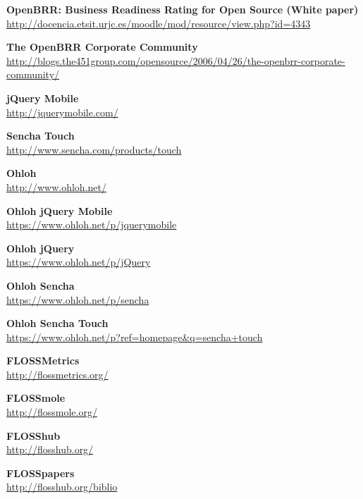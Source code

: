 \documentclass[a4paper,12pt]{book}
\begin{document}
\begin{thebibliography}{25}
 

\textbf{OpenBRR: Business Readiness Rating for
Open Source (White paper)}\\
{\footnotesize\url{
http://docencia.etsit.urjc.es/moodle/mod/resource/view.php?id=4343}}

\textbf{The OpenBRR Corporate Community}\\
{\footnotesize\url{http://blogs.the451group.com/opensource/2006/04/26/the-openbrr-corporate-community/}}

\textbf{jQuery Mobile}\\
{\footnotesize\url{http://jquerymobile.com/}}

\textbf{Sencha Touch}\\
{\footnotesize\url{http://www.sencha.com/products/touch}}

\textbf{Ohloh}\\
{\footnotesize\url{http://www.ohloh.net/}}

\textbf{Ohloh jQuery Mobile}\\
{\footnotesize\url{https://www.ohloh.net/p/jquerymobile}}

\textbf{Ohloh jQuery}\\
{\footnotesize\url{https://www.ohloh.net/p/jQuery}}

\textbf{Ohloh Sencha}\\
{\footnotesize\url{https://www.ohloh.net/p/sencha}}

\textbf{Ohloh Sencha Touch}\\
{\footnotesize\url{https://www.ohloh.net/p?ref=homepage\&q=sencha+touch}}

\textbf{FLOSSMetrics}\\
{\footnotesize\url{http://flossmetrics.org/}}

\textbf{FLOSSmole}\\
{\footnotesize\url{http://flossmole.org/}}

\textbf{FLOSShub}\\
{\footnotesize\url{http://flosshub.org/}}

\textbf{FLOSSpapers}\\
{\footnotesize\url{http://flosshub.org/biblio}}


\end{thebibliography}
\end{document}
